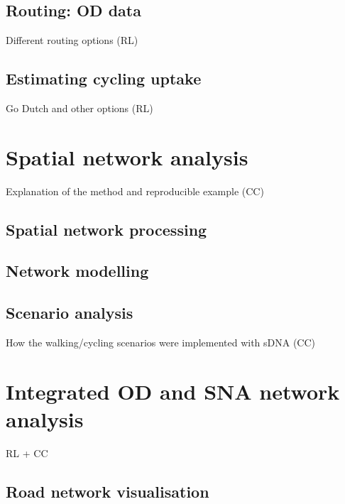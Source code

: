 \documentclass[galley]{jtlu-article-2col}
\begin{document}
\hypertarget{routing-od-data}{%
\subsection{Routing: OD data}\label{routing-od-data}}

Different routing options (RL)

\hypertarget{estimating-cycling-uptake}{%
\subsection{Estimating cycling uptake}\label{estimating-cycling-uptake}}

Go Dutch and other options (RL)

\hypertarget{spatial-network-analysis}{%
\section{Spatial network analysis}\label{spatial-network-analysis}}

Explanation of the method and reproducible example (CC)

\hypertarget{spatial-network-processing}{%
\subsection{Spatial network processing}\label{spatial-network-processing}}

\hypertarget{network-modelling}{%
\subsection{Network modelling}\label{network-modelling}}

\hypertarget{scenario-analysis}{%
\subsection{Scenario analysis}\label{scenario-analysis}}

How the walking/cycling scenarios were implemented with sDNA (CC)

\hypertarget{integrated-od-and-sna-network-analysis}{%
\section{Integrated OD and SNA network analysis}\label{integrated-od-and-sna-network-analysis}}

RL + CC

\hypertarget{road-network-visualisation}{%
\subsection{Road network visualisation}\label{road-network-visualisation}}
\end{document}
